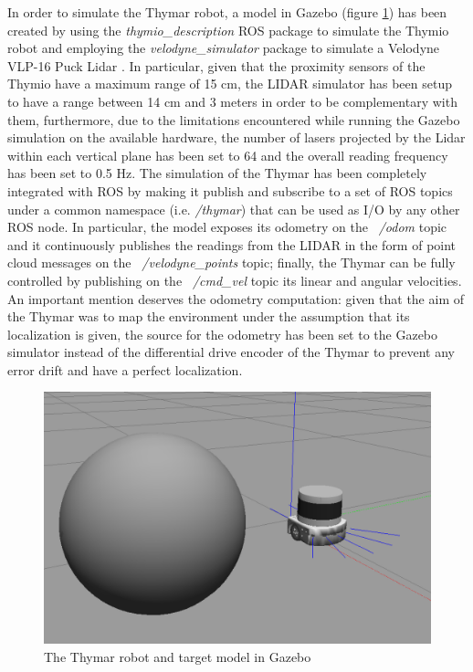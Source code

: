 \documentclass[9pt,conference]{IEEEtran}
\begin{document}
In order to simulate the Thymar robot, a model in Gazebo (figure \ref{fig:thymar_model}) has been created by using the \emph{thymio\_description} ROS package \cite{thymio_description} to simulate the Thymio robot and employing the \emph{velodyne\_simulator} package \cite{velodyne_simulator} to simulate a Velodyne VLP-16 Puck Lidar \cite{VLP16}. In particular, given that the proximity sensors of the Thymio have a maximum range of 15 cm, the LIDAR simulator has been setup to have a range between 14 cm and 3 meters in order to be complementary with them, furthermore, due to the limitations encountered while running the Gazebo simulation on the available hardware, the number of lasers projected by the Lidar within each vertical plane has been set to 64 and the overall reading frequency has been set to 0.5 Hz. The simulation of the Thymar has been completely integrated with ROS by making it publish and subscribe to a set of ROS topics under a common namespace (i.e. \emph{/thymar}) that can be used as I/O by any other ROS node. In particular, the model exposes its odometry on the \emph{~/odom} topic and it continuously publishes the readings from the LIDAR in the form of point cloud messages on the \emph{~/velodyne\_points} topic; finally, the Thymar can be fully controlled by publishing on the \emph{~/cmd\_vel} topic its linear and angular velocities. An important mention deserves the odometry computation: given that the aim of the Thymar was to map the environment under the assumption that its localization is given, the source for the odometry has been set to the Gazebo simulator instead of the differential drive encoder of the Thymar to prevent any error drift and have a perfect localization.

\begin{figure}[h!]
    \centering
    \includegraphics[width=1\linewidth]{images/01 robot.png}
    \caption{The Thymar robot and target model in Gazebo}
    \label{fig:thymar_model}
\end{figure}
\end{document}
